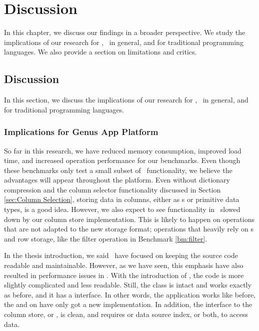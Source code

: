\chapter{Discussion}
\label{chap:Discussion }
In this chapter, we discuss our findings in a broader perspective. We study the implications of our research for \gap, \mde~in general, and for traditional programming languages. We also provide a section on limitations and critics. 

\clearpage

\section{Discussion}
\label{sec:Discussion}
In this section, we discuss the implications of our research for \gap, \mde~in general, and for traditional programming languages.

\subsection{Implications for Genus App Platform}
\label{sub:Implications for Genus App Platform}
So far in this research, we have reduced memory consumption, improved load time, and increased operation performance for our benchmarks. Even though these benchmarks only test a small subset of \gap~functionality, we believe the advantages will appear throughout the platform. Even without dictionary compression and the column selector functionality discussed in Section \ref{sec:Column Selection}, storing data in columns, either as s or primitive data types, is a good idea. However, we also expect to see functionality in \gap~slowed down by our column store implementation. This is likely to happen on operations that are not adapted to the new storage format; operations that heavily rely on s and row storage, like the filter operation in Benchmark \ref{bm:filter}.

In the thesis introduction, we said \genus~have focused on keeping the source code readable and maintainable. However, as we have seen, this emphasis have also resulted in performance issues in \gap. With the introduction of , the code is more slightly complicated and less readable. Still, the  class is intact and works exactly as before, and it has a  interface. In other words, the application works like before, the  and  on  have only got a new implementation. In addition, the interface to the column store, or , is clean, and requires  or data source index, or both, to access data.

